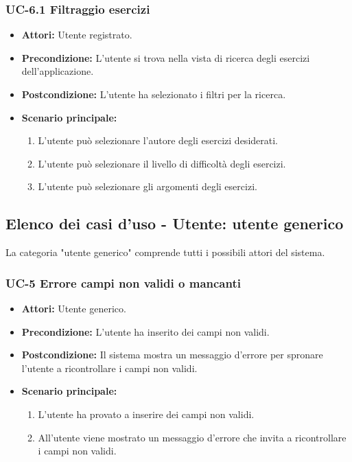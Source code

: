 		
\subsubsection{UC-6.1 Filtraggio esercizi }
\begin{itemize}
\item \textbf{Attori:} Utente registrato.
			\item \textbf{Precondizione:} L'utente si trova nella vista di ricerca degli esercizi dell'applicazione.
			\item \textbf{Postcondizione:} L'utente ha selezionato i filtri per la ricerca.
			\item \textbf{Scenario principale:}
				\begin{enumerate}
					\item L'utente può selezionare l'autore degli esercizi desiderati.
					\item L'utente può selezionare il livello di difficoltà degli esercizi.
					\item L'utente può selezionare gli argomenti degli esercizi.
				\end{enumerate}

\end{itemize}
	
\subsection{Elenco dei casi d'uso - Utente: utente generico}
La categoria "utente generico" comprende tutti i possibili attori del sistema.
\subsubsection{UC-5 Errore campi non validi o mancanti}
\begin{itemize}
\item \textbf{Attori:} Utente generico. 
\item \textbf{Precondizione:} L'utente ha inserito dei campi non validi.
\item \textbf{Postcondizione:} Il sistema mostra un messaggio d'errore per spronare l'utente a ricontrollare i campi non validi.
\item \textbf{Scenario principale:}
		\begin{enumerate}
		\item L'utente ha provato a inserire dei campi non validi.
		\item All'utente viene mostrato un messaggio d'errore che invita a ricontrollare i campi non validi.
		\end{enumerate}
\end{itemize}

